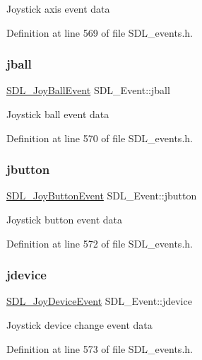 Joystick axis event data 

Definition at line 569 of file S\+D\+L\+\_\+events.\+h.

\mbox{\label{union_s_d_l___event_ae433f511e3383d17f8fe02df745ee8f8}} 
\subsubsection{\texorpdfstring{jball}{jball}}
{\footnotesize\ttfamily \mbox{\hyperlink{struct_s_d_l___joy_ball_event}{S\+D\+L\+\_\+\+Joy\+Ball\+Event}} S\+D\+L\+\_\+\+Event\+::jball}

Joystick ball event data 

Definition at line 570 of file S\+D\+L\+\_\+events.\+h.

\mbox{\label{union_s_d_l___event_a591104d64903ae1cf70874fb5d3124ff}} 
\subsubsection{\texorpdfstring{jbutton}{jbutton}}
{\footnotesize\ttfamily \mbox{\hyperlink{struct_s_d_l___joy_button_event}{S\+D\+L\+\_\+\+Joy\+Button\+Event}} S\+D\+L\+\_\+\+Event\+::jbutton}

Joystick button event data 

Definition at line 572 of file S\+D\+L\+\_\+events.\+h.

\mbox{\label{union_s_d_l___event_a17514dc19a846ea1b5fbe44123700c4c}} 
\subsubsection{\texorpdfstring{jdevice}{jdevice}}
{\footnotesize\ttfamily \mbox{\hyperlink{struct_s_d_l___joy_device_event}{S\+D\+L\+\_\+\+Joy\+Device\+Event}} S\+D\+L\+\_\+\+Event\+::jdevice}

Joystick device change event data 

Definition at line 573 of file S\+D\+L\+\_\+events.\+h.

\mbox{\label{union_s_d_l___event_a421b40e0f8e01f181c8d5548cff1dd1d}} 
